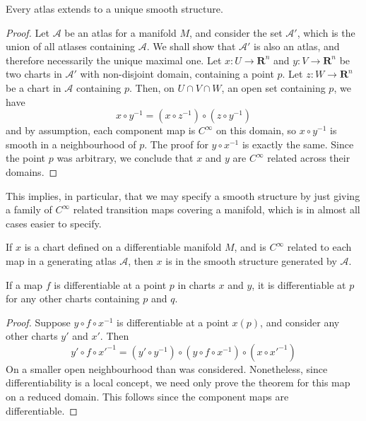 \begin{lemma}
    Every atlas extends to a unique smooth structure.
\end{lemma}
\begin{proof}
Let $\mathcal{A}$ be an atlas for a manifold $M$, and consider the set $\mathcal{A}'$, which is the union of all atlases containing $\mathcal{A}$. We shall show that $\mathcal{A}'$ is also an atlas, and therefore necessarily the unique maximal one. Let $x:U \to \mathbf{R}^n$ and $y:V \to \mathbf{R}^n$ be two charts in $\mathcal{A}'$ with non-disjoint domain, containing a point $p$. Let $z:W \to \mathbf{R}^n$ be a chart in $\mathcal{A}$ containing $p$. Then, on $U \cap V \cap W$, an open set containing $p$, we have
%
\[ x \circ y^{-1} = (x \circ z^{-1}) \circ (z \circ y^{-1}) \]
%
and by assumption, each component map is $C^\infty$ on this domain, so $x \circ y^{-1}$ is smooth in a neighbourhood of $p$. The proof for $y \circ x^{-1}$ is exactly the same. Since the point $p$ was arbitrary, we conclude that $x$ and $y$ are $C^\infty$ related across their domains.
\end{proof}

This implies, in particular, that we may specify a smooth structure by just giving a family of $C^\infty$ related transition maps covering a manifold, which is in almost all cases easier to specify.

\begin{corollary}
    If $x$ is a chart defined on a differentiable manifold $M$, and is $C^\infty$ related to each map in a generating atlas $\mathcal{A}$, then $x$ is in the smooth structure generated by $\mathcal{A}$.
\end{corollary}

\begin{lemma}
    If a map $f$ is differentiable at a point $p$ in charts $x$ and $y$, it is differentiable at $p$ for any other charts containing $p$ and $q$.
\end{lemma}
\begin{proof}
    Suppose $y \circ f \circ x^{-1}$ is differentiable at a point $x(p)$, and consider any other charts $y'$ and $x'$. Then
    \[ y' \circ f \circ x'^{-1} = (y' \circ y^{-1}) \circ (y \circ f \circ x^{-1}) \circ (x \circ x'^{-1}) \]
    On a smaller open neighbourhood than was considered. Nonetheless, since differentiability is a local concept, we need only prove the theorem for this map on a reduced domain. This follows since the component maps are differentiable.
\end{proof}

